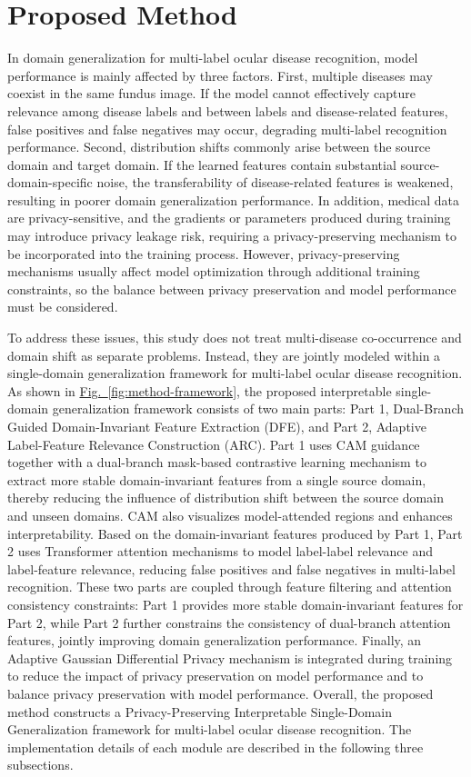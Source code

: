
\section{Proposed Method}

In domain generalization for multi-label ocular disease recognition, model performance is mainly affected by three factors. First, multiple diseases may coexist in the same fundus image. If the model cannot effectively capture relevance among disease labels and between labels and disease-related features, false positives and false negatives may occur, degrading multi-label recognition performance. Second, distribution shifts commonly arise between the source domain and target domain. If the learned features contain substantial source-domain-specific noise, the transferability of disease-related features is weakened, resulting in poorer domain generalization performance. In addition, medical data are privacy-sensitive, and the gradients or parameters produced during training may introduce privacy leakage risk, requiring a privacy-preserving mechanism to be incorporated into the training process. However, privacy-preserving mechanisms usually affect model optimization through additional training constraints, so the balance between privacy preservation and model performance must be considered.

To address these issues, this study does not treat multi-disease co-occurrence and domain shift as separate problems. Instead, they are jointly modeled within a single-domain generalization framework for multi-label ocular disease recognition. As shown in \hyperref[fig:method-framework]{Fig.~\ref*{fig:method-framework}}, the proposed interpretable single-domain generalization framework consists of two main parts: Part 1, Dual-Branch Guided Domain-Invariant Feature Extraction (DFE), and Part 2, Adaptive Label-Feature Relevance Construction (ARC). Part 1 uses CAM guidance together with a dual-branch mask-based contrastive learning mechanism to extract more stable domain-invariant features from a single source domain, thereby reducing the influence of distribution shift between the source domain and unseen domains. CAM also visualizes model-attended regions and enhances interpretability. Based on the domain-invariant features produced by Part 1, Part 2 uses Transformer attention mechanisms to model label-label relevance and label-feature relevance, reducing false positives and false negatives in multi-label recognition. These two parts are coupled through feature filtering and attention consistency constraints: Part 1 provides more stable domain-invariant features for Part 2, while Part 2 further constrains the consistency of dual-branch attention features, jointly improving domain generalization performance. Finally, an Adaptive Gaussian Differential Privacy mechanism is integrated during training to reduce the impact of privacy preservation on model performance and to balance privacy preservation with model performance. Overall, the proposed method constructs a Privacy-Preserving Interpretable Single-Domain Generalization framework for multi-label ocular disease recognition. The implementation details of each module are described in the following three subsections.

